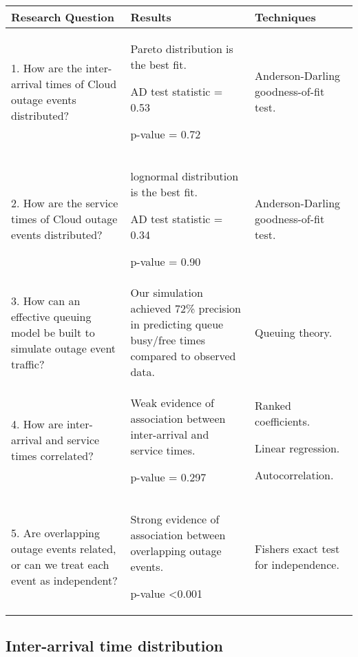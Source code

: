 \documentclass[5p]{elsarticle}
\begin{document}
\begin {table*}[]
\caption {Summary of research question, results and techniques used} 
\begin{flushleft}
\begin{tabular}{| p{6.5cm} | p{5.5cm} | p{5cm} |} \hline \bf{Research Question}  & \bf{Results} & \bf{Techniques} 
\\ \hline 1. How are the inter-arrival times of Cloud outage events distributed? & Pareto distribution is the best fit. \par AD test statistic = 0.53 \par p-value = 0.72  & Anderson-Darling goodness-of-fit test. \cite {anderson1952asymptotic}
\\ \hline 2. How are the service times of Cloud outage events distributed? & lognormal distribution is the best fit. \par AD test statistic = 0.34 \par p-value = 0.90 & Anderson-Darling goodness-of-fit test. \cite {anderson1952asymptotic}
\\ \hline 3. How can an effective queuing model be built to simulate outage event traffic? & Our simulation achieved 72\% precision in predicting queue busy/free times compared to observed data. &  Queuing theory. \cite{kleinrock1975queuing,gross2008fundamentals}
\\ \hline 4. How are inter-arrival and service times correlated? & Weak evidence of association between inter-arrival and service times. \par p-value = 0.297 & Ranked coefficients. \cite{fisher1915frequency,spearman1904proof} \par Linear regression. \cite{galton1890kinship} \par Autocorrelation. \cite{box1970distribution}
\\ \hline 5. Are overlapping outage events related, or can we treat each event as independent? & Strong evidence of association between overlapping outage events. \par p-value \textless 0.001 & Fishers exact test for independence. \cite{fisher1922interpretation,fisher1925statistical}
\\ \hline 
 \end{tabular}
\end{flushleft}
\end{table*}


\subsection{Inter-arrival time distribution}
\end{document}
